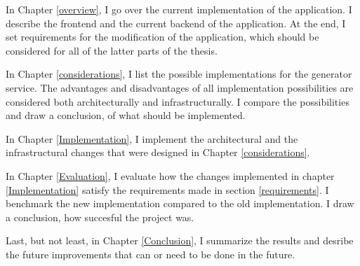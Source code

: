 In Chapter \ref{overview}, I go over the current implementation of the application. I describe the frontend and the current backend of the application.
At the end, I set requirements for the modification of the application, which should be considered for all of the latter parts of the thesis.

In Chapter \ref{considerations}, I list the possible implementations for the generator service. The advantages and disadvantages of all implementation 
possibilities are considered both architecturally and infrastructurally. I compare the possibilities and draw a conclusion, of what should be implemented.

In Chapter \ref{Implementation}, I implement the architectural and the infrastructural changes that were designed in Chapter \ref{considerations}.

In Chapter \ref{Evaluation}, I evaluate how the changes implemented in chapter \ref{Implementation} satisfy the requirements made 
in section \ref{requirements}. I benchmark the new implementation compared to the old implementation. I draw a conclusion, how succesful the 
project was.

Last, but not least, in Chapter \ref{Conclusion}, I summarize the results and desribe the future improvements that can or need to be 
done in the future.

